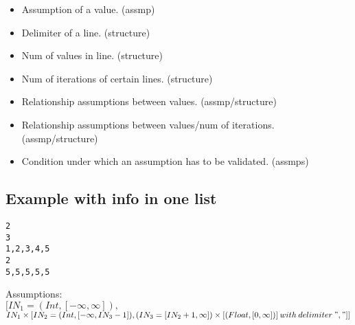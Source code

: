 \documentclass[11pt]{article}
\begin{document}
\begin{itemize}
  \item Assumption of a value. (assmp)
  \item Delimiter of a line. (structure)
  \item Num of values in line. (structure)
  \item Num of iterations of certain lines. (structure)
  \item Relationship assumptions between values. (assmp/structure)
  \item Relationship assumptions between values/num of iterations. (assmp/structure)
  \item Condition under which an assumption has to be validated. (assmps)
\end{itemize}

\subsection{Example with info in one list}

\begin{lstlisting}[numbers=none]
2
3
1,2,3,4,5
2
5,5,5,5,5
\end{lstlisting}

Assumptions:\\
$[IN_1 = (Int, [-\infty, \infty]),$\\
$IN_1 \times [IN_2 = (Int, [-\infty, IN_3-1]), (IN_3 = [IN_2+1, \infty]) \times [(Float, [0, \infty])]\:with\:delimiter\:","]]$\\
\end{document}
